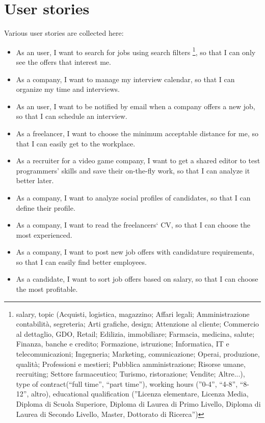 \documentclass[12pt, a4paper]{article}
\begin{document}
\section{User stories}
Various user stories are collected here:
\begin{itemize}
	\item As an user, I want to search for jobs using search filters
		\footnote{salary, topic (Acquisti, logistica, magazzino; Affari legali; 
		Amministrazione contabilità, segreteria; Arti grafiche, design; 
		Attenzione al cliente; Commercio al dettaglio, GDO, Retail; Edilizia, immobiliare;  
		Farmacia, medicina, salute; Finanza, banche e credito; Formazione, istruzione; 
		Informatica, IT e telecomunicazioni; Ingegneria; Marketing, comunicazione; 
		Operai, produzione, qualità; Professioni e mestieri; 
		Pubblica amministrazione; Risorse umane, recruiting; Settore farmaceutico; 
		Turismo, ristorazione; Vendite; Altre...), type of contract(“full time”, “part time”), working hours (”0-4”, “4-8”, “8-12”, altro), 
		educational qualification (”Licenza elementare, Licenza Media, Diploma di Scuola Superiore, 
		Diploma di Laurea di Primo Livello, Diploma di Laurea di Secondo Livello, Master, Dottorato di Ricerca”)}, 
		so that I can only see the offers that interest me.
	\item As a company, I want to manage my interview calendar, 
		so that I can organize my time and interviews.
	\item As an user, I want to be notified by email when a company 
		offers a new job, so that I can schedule an interview.
	\item As a freelancer, I want to choose the minimum acceptable 
		distance for me, so that I can easily get to the workplace. 
	\item As a recruiter for a video game company, I want to get a shared editor 
		to test programmers’ skills and save their on-the-fly work, so that 
		I can analyze it better later.
	\item As a company, I want to analyze social profiles of candidates, 
		so that I can define their profile.
	\item As a company, I want to read the freelancers‘ CV, 
		so that I can choose the most experienced.
	\item As a company, I want to post new job offers with candidature 
		requirements, so that I can easily find better employees.
	\item As a candidate, I want to sort job offers based on salary, 
		so that I can choose the most profitable.  
\end{itemize}
\end{document}
